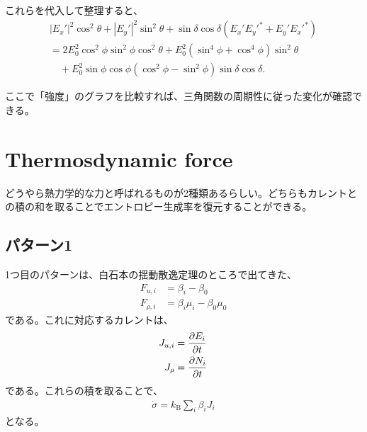 \documentclass[a4paper,11pt]{jsarticle}
\numberwithin{equation}{section}
\begin{document}
これらを代入して整理すると、
\begin{align}
    |E_x'|^2 \cos^2 \theta + |E_y'|^2 \sin^2 \theta + \sin \delta \cos \delta (E_x' E_y'^* + E_y' E_x'^*) \\
    = 2 E_0^2 \cos^2 \phi \sin^2 \phi \cos^2 \theta + E_0^2 (\sin^4 \phi + \cos^4 \phi) \sin^2 \theta \\
    \quad + E_0^2 \sin \phi \cos \phi (\cos^2 \phi - \sin^2 \phi) \sin \delta \cos \delta.
\end{align}

ここで「強度」のグラフを比較すれば、三角関数の周期性に従った変化が確認できる。

\section{Thermosdynamic force}
どうやら熱力学的な力と呼ばれるものが2種類あるらしい。どちらもカレントとの積の和を取ることでエントロピー生成率を復元することができる。

\subsection{パターン1}
1つ目のパターンは、白石本の揺動散逸定理のところで出てきた、
\begin{align}
    F_{u,i} &= \beta_i - \beta_0\\
    F_{\rho,i} &= \beta_i \mu_i - \beta_0 \mu_0
\end{align}
である。これに対応するカレントは、
\begin{align}
    J_{u,i} &= \pdv{E_i}{t} \\
    J_{\rho} &= \pdv{N_i}{t}
\end{align}
である。これらの積を取ることで、
\begin{align}
    \dot{\sigma} = k_{\text{B}}\sum_{i} \beta_{i}J_{i}
\end{align}
となる。
\end{document}
